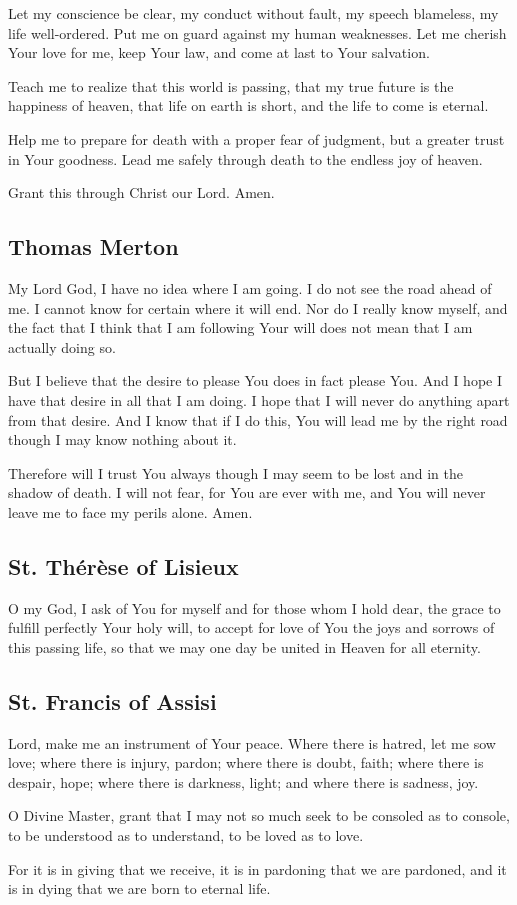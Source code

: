 \documentclass[12pt]{article}
\newcommand{\prayertitle}[1]{\subsection{#1}}
\begin{document}
Let my conscience be clear,
my conduct without fault,
my speech blameless,
my life well-ordered.
Put me on guard against my human weaknesses.
Let me cherish Your love for me,
keep Your law,
and come at last to Your salvation.

Teach me to realize that this world is passing,
that my true future is the happiness of heaven,
that life on earth is short,
and the life to come is eternal.

Help me to prepare for death with a proper fear of judgment, but a greater trust in Your goodness.
Lead me safely through death to the endless joy of heaven.

Grant this through Christ our Lord. Amen.

\prayertitle{Thomas Merton}
My Lord God, I have no idea where I am going. 
I do not see the road ahead of me.
I cannot know for certain where it will end.
Nor do I really know myself,  and the fact that I think that I am following Your will does not mean that I am actually doing so.

But I believe that the desire to please You does in fact please You. 
And I hope I have that desire in all that I am doing. 
I hope that I will never do anything apart from that desire. 
And I know that if I do this, You will lead me by the right road though I may know nothing about it.

Therefore will I trust You always though I may seem to be lost and in the shadow of death.
I will not fear, for You are ever with me,  and You will never leave me to face my perils alone. 
Amen.  

\prayertitle{St. Th\'{e}r\`{e}se of Lisieux}
O my God, I ask of You for myself and for those whom I hold dear, the grace to fulfill perfectly Your holy will, to accept for love of You the joys and sorrows of this passing life, so that we may one day be united in Heaven for all eternity.

\prayertitle{St. Francis of Assisi}
Lord, make me an instrument of Your peace.
Where there is hatred, let me sow love;
where there is injury, pardon;
where there is doubt, faith;
where there is despair, hope;
where there is darkness, light;
and where there is sadness, joy.

O Divine Master, grant that I may not so much seek to be consoled as to console, to be understood as to understand, to be loved as to love.

For it is in giving that we receive, it is in pardoning that we are pardoned, and it is in dying that we are born to eternal life.
\end{document}
